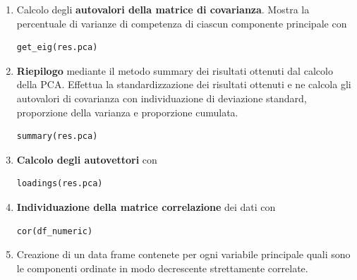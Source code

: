 \begin{enumerate}
\noindent
 Ho deciso di far uso della funzione \textit{prcomp} perch\`e usa la decomposizione del valore singolare (SGV) che offre una precisione leggermente migliore rispetto all'uso del metodo princomp.
 Il metodo \textit{prcomp} include nei propri elementi di output:
 \begin{enumerate}
 \item sdev: deviazione standard delle componenti principali;
 \item rotation: la matrice dei carichi delle variabili ovvero le colonne degli autovettori;
 \item center: la media variabile, indica se le variabili devono essere spostate per essere centrate sullo zero;
 \item scale: deviazione standard delle variabili;
 \item x: coordinate degli individui sulle componenti principali.
 \end{enumerate}
 \noindent
\item Calcolo degli \textbf{autovalori della matrice di covarianza}. Mostra la percentuale di varianze di competenza di ciascun componente principale con
\begin{verbatim}
get_eig(res.pca)
\end{verbatim}

\item \textbf{Riepilogo} mediante il metodo summary dei risultati ottenuti dal calcolo della PCA. Effettua la standardizzazione dei risultati ottenuti e ne calcola gli autovalori di covarianza con individuazione di deviazione standard, proporzione della varianza e proporzione cumulata.
\begin{verbatim}
summary(res.pca)
\end{verbatim}
\item \textbf{Calcolo degli autovettori} con
\begin{verbatim}
loadings(res.pca)
\end{verbatim}

\item \textbf{Individuazione della matrice correlazione} dei dati con
\begin{verbatim}
cor(df_numeric)
\end{verbatim}

\item Creazione di un data frame contenete per ogni variabile principale quali sono le componenti ordinate in modo decrescente strettamente correlate.
\end{enumerate}

